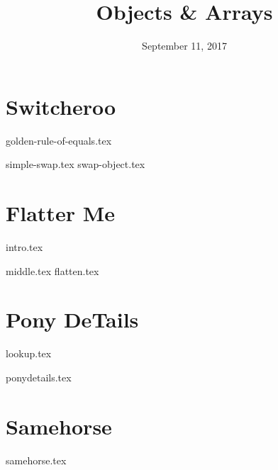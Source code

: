 \documentclass[11pt]{exam}
\title{Objects \& Arrays}
\date{September 11, 2017}
\begin{document}
\maketitle

\section{Switcheroo}
{golden-rule-of-equals.tex}
\begin{questions}
{simple-swap.tex}
{swap-object.tex}
\end{questions}

\newpage
\section{Flatter Me}
{intro.tex}
\begin{questions}
{middle.tex}
{flatten.tex}
\end{questions}

\newpage
\section{Pony DeTails}
{lookup.tex}
\begin{questions}
{ponydetails.tex}
\end{questions}

\newpage
\section{Samehorse\extra{}\midterm{}}
\begin{questions}
{samehorse.tex}
\end{questions}
\end{document}
